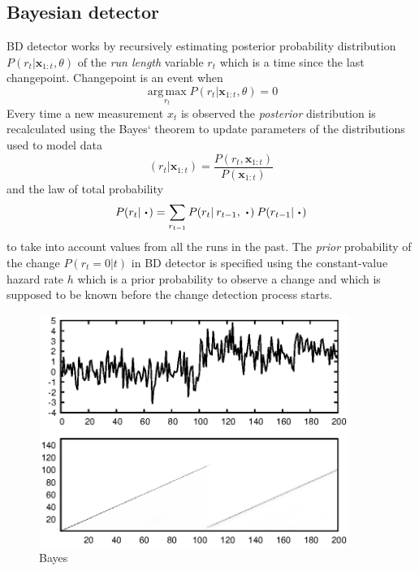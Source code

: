 \subsection{Bayesian detector}

\cite{adams2007bayesian}
BD detector works by recursively estimating posterior probability distribution $P(r_t | \pmb{x}_{1:t}, \theta)$ of the \textit{run length} variable $r_t$ which is a time since the last changepoint.
Changepoint is an event when
\begin{equation}
	\operatorname*{arg\,max}_{r_t} P(r_t | \pmb{x}_{1:t}, \theta) = 0
\end{equation}
Every time a new measurement $x_t$ is observed the \textit{posterior} distribution is recalculated using the Bayes` theorem to update parameters of the distributions used to model data
\[
(r_t | \pmb{x}_{1:t}) = \frac{P(r_t, \pmb{x}_{1:t})}{P(\pmb{x}_{1:t})}
\]
and the law of total probability
\begin{equation}
	P(r_t|\:\LargeCdot) = \sum_{r_{t-1}} P(r_{t} | \: r_{t-1},\:\LargeCdot) \: P(r_{t-1}|\:\LargeCdot)
\end{equation}
to take into account values from all the runs in the past.
The \textit{prior} probability of the change $P(r_t=0|t)$ in BD detector is specified using the constant-value hazard rate $h$ which is a prior probability to observe a change and which is supposed to be known before the change detection process starts.
\begin{figure}[!htb]
	\centering
	\includegraphics[width=0.9\textwidth]{images/example_output_bayes.eps}
	\caption{Bayes}\label{fig:bayes_output_example}
\end{figure}


